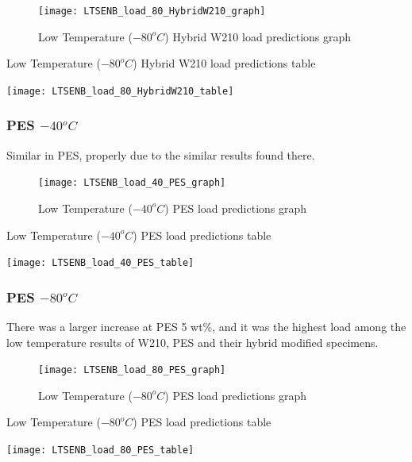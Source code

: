 \documentclass[numbers=noendperiod,chapterprefix=on]{icldt} %
\begin{document}
\begin{figure}[!hp]
  \centering
  \texttt{[image: LTSENB\_load\_80\_HybridW210\_graph]}\label{LTSENB_load_80_HybridW210_graph}
  \caption{Low Temperature ($ -80 ^{o}C$) Hybrid W210 load predictions graph}
  \end{figure}
 \FloatBarrier
 
 \begin{table}
    \centering
    \caption{Low Temperature ($ -80 ^{o}C$) Hybrid W210 load predictions table}\label{LTSENB_load_80_HybridW210_table}
    \texttt{[image: LTSENB\_load\_80\_HybridW210\_table]}
    \end{table}
    \FloatBarrier

\subsubsection{PES $ -40 ^{o}C$}
Similar in PES, properly due to the similar results found there.

\begin{figure}[!hp]
  \centering
  \texttt{[image: LTSENB\_load\_40\_PES\_graph]}\label{LTSENB_load_40_PES_graph}
  \caption{Low Temperature ($ -40 ^{o}C$) PES load predictions graph}
  \end{figure}
 \FloatBarrier
 
 \begin{table}
    \centering
    \caption{Low Temperature ($ -40 ^{o}C$) PES load predictions table}\label{LTSENB_load_40_PES_table}
    \texttt{[image: LTSENB\_load\_40\_PES\_table]}
    \end{table}
    \FloatBarrier
     
\subsubsection{PES $ -80 ^{o}C$}
There was a larger increase at PES 5 wt\%, and it was the highest load among the low temperature results of W210, PES and their hybrid modified specimens.

\begin{figure}[!hp]
  \centering
  \texttt{[image: LTSENB\_load\_80\_PES\_graph]}\label{LTSENB_load_80_PES_graph}
  \caption{Low Temperature ($ -80 ^{o}C$) PES load predictions graph}
  \end{figure}
 \FloatBarrier
 
 \begin{table}
    \centering
    \caption{Low Temperature ($ -80 ^{o}C$) PES load predictions table}\label{LTSENB_load_80_PES_table}
    \texttt{[image: LTSENB\_load\_80\_PES\_table]}
    \end{table}
    \FloatBarrier
     
\end{document}
